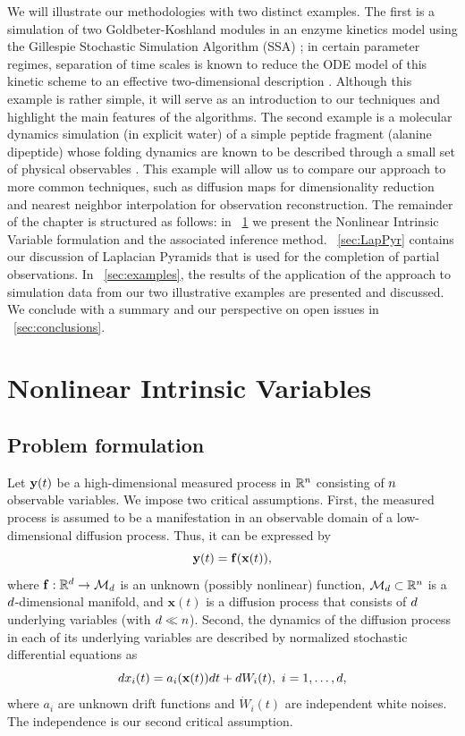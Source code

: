 We will illustrate our methodologies with two distinct examples.
%
The first is a simulation
of two Goldbeter-Koshland modules in an enzyme kinetics model using the Gillespie Stochastic Simulation
Algorithm (SSA) \cite{gillespie1977exact};
in certain parameter regimes, separation of time scales is known
to reduce the ODE model of this kinetic scheme to an effective two-dimensional description \cite{zagaris2012stability}.
%
Although this example is rather simple, it will serve as an introduction to our techniques and highlight the main features of the algorithms.
%
The second example is a molecular dynamics
simulation (in explicit water) of a simple peptide fragment (alanine dipeptide) whose folding
dynamics are known to be described through a small set of physical observables \cite{bolhuis2000reaction}.
%
This example will allow us to compare our approach to more common techniques,
such as diffusion maps \cite{coifman2005geometric} for dimensionality reduction
and nearest neighbor interpolation for observation reconstruction.
%
The remainder of the chapter is structured as follows: in \sec~\ref{sec:NIV} we present the Nonlinear Intrinsic Variable formulation and
the associated inference method.
%
\sec~\ref{sec:LapPyr} contains our discussion of Laplacian Pyramids that
is used for the completion of partial observations.
%
In \sec~\ref{sec:examples}, the results
of the application of the approach to simulation data from our two illustrative examples are presented and discussed.
%
We conclude with a summary and our perspective on open issues in \sec~\ref{sec:conclusions}.

\section{Nonlinear Intrinsic Variables} \label{sec:NIV}

\subsection{Problem formulation}
Let $\mathbf{y}(t)$ be a high-dimensional measured process in $\mathbb{R}^n$ consisting of $n$ observable variables.
%
We impose two critical assumptions. First, the measured process is assumed to be a manifestation in an observable domain of a low-dimensional diffusion process. Thus, it can be expressed by
\begin{equation}
	\mathbf{y}(t) = \mathbf{f}(\mathbf{x}(t)),
\end{equation}
where $\mathbf{f}:\mathbb{R}^d \rightarrow \mathcal{M}_d$ is an unknown (possibly nonlinear) function, $\mathcal{M}_d \subset \mathbb{R}^n$ is a $d$-dimensional manifold,
and $\mathbf{x}(t)$ is a diffusion process that consists of $d$ underlying variables (with $d \ll n$).
%
Second, the dynamics of the diffusion process in each of its underlying variables are described by normalized stochastic differential equations as
\begin{equation}
	d x_i(t) = a_i (\mathbf{x}(t)) dt + d W_i(t), \ i=1,\ldots,\lowdim,
	\label{eq:dynamics}
\end{equation}
where $a_i$ are unknown drift functions and $\dot{W}_i(t)$ are independent white noises.
%
The independence is our second critical assumption.

